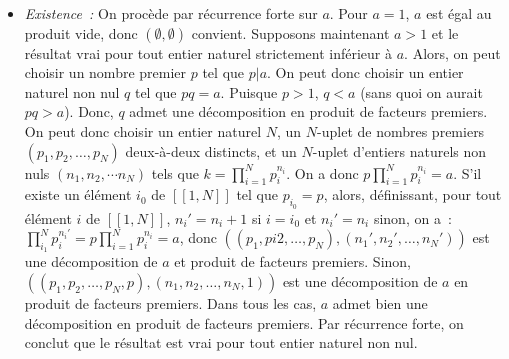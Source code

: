 \begin{itemize}
    \item \textit{Existence :} On procède par récurrence forte sur $a$. 
        Pour $a=1$, $a$ est égal au produit vide, donc $(\emptyset, \emptyset)$ convient. 
        Supposons maintenant $a > 1$ et le résultat vrai pour tout entier naturel strictement inférieur à $a$. 
        Alors, on peut choisir un nombre premier $p$ tel que $p \vert a$.
        On peut donc choisir un entier naturel non nul $q$ tel que $p q = a$. 
        Puisque $p > 1$, $q < a$ (sans quoi on aurait $p q > a$).
        Donc, $q$ admet une décomposition en produit de facteurs premiers. 
        On peut donc choisir un entier naturel $N$, un $N$-uplet de nombres premiers $\left( p_1, p_2, \dots, p_N \right)$ deux-à-deux distincts, et un $N$-uplet d'entiers naturels non nuls $\left( n_1, n_2, \cdots n_N \right)$ tels que $k = \prod_{i=1}^N p_i^{n_i}$.
        On a donc $p \prod_{i=1}^N p_i^{n_i} = a$. 
        S'il existe un élément $i_0$ de $[\![1,N]\!]$ tel que $p_{i_0} = p$, alors, définissant, pour tout élément $i$ de $[\![1,N]\!]$, $n_i' = n_i + 1$ si $i = i_0$ et $n_i' = n_i$ sinon, on a : $\prod_{i_1}^N p_i^{n_i'} = p \prod_{i=1}^N p_i^{n_i} = a$, donc $\left(\left( p_1, pi2, \dots, p_N \right), \left(n_1', n_2', \dots, n_N' \right) \right)$ est une décomposition de $a$ et produit de facteurs premiers. 
        Sinon, $\left( \left( p_1, p_2, \dots, p_N, p \right), \left( n_1, n_2, \dots, n_N, 1 \right) \right)$ est une décomposition de $a$ en produit de facteurs premiers.
        Dans tous les cas, $a$ admet bien une décomposition en produit de facteurs premiers.
        Par récurrence forte, on conclut que le résultat est vrai pour tout entier naturel non nul.


\end{itemize}
